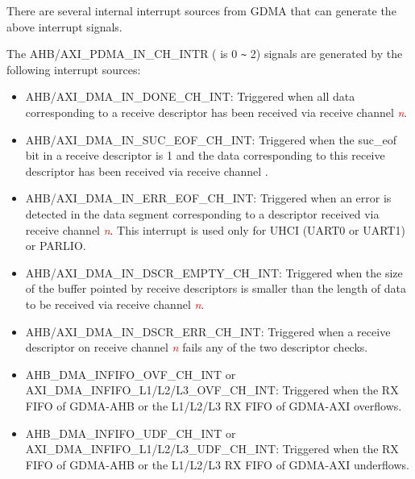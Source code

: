 \documentclass[main\_\_EN.tex]{subfiles}
\begin{document}
There are several internal interrupt sources from GDMA that can generate the above interrupt signals.

The AHB/AXI\_PDMA\_IN\_CH\_INTR ( is 0 \verb+~+ 2) signals are generated by the following interrupt sources:

\begin{itemize}
    \item \label{int:GDMAINDONEINT}AHB/AXI\_DMA\_IN\_DONE\_CH\_INT: Triggered when all data corresponding to a receive descriptor has been received via receive channel \textcolor{red}{\it{n}}.
    \item \label{int:GDMAINSUCEOFINT}AHB/AXI\_DMA\_IN\_SUC\_EOF\_CH\_INT: Triggered when the suc\_eof bit in a receive descriptor is 1 and the data corresponding to this receive descriptor has been received via receive channel .
    \item \label{int:GDMAINERREOFINT}AHB/AXI\_DMA\_IN\_ERR\_EOF\_CH\_INT: Triggered when an error is detected in the data segment corresponding to a descriptor received via receive channel \textcolor{red}{\it{n}}. This interrupt is used only for UHCI (UART0 or UART1) or PARLIO.
    \item \label{int:GDMAINDSCREMPTYINT}AHB/AXI\_DMA\_IN\_DSCR\_EMPTY\_CH\_INT: Triggered when the size of the buffer pointed by receive descriptors is smaller than the length of data to be received via receive channel \textcolor{red}{\it{n}}.
    \item \label{int:GDMAINDSCRERRINT}AHB/AXI\_DMA\_IN\_DSCR\_ERR\_CH\_INT: Triggered when a receive descriptor on receive channel \textcolor{red}{\it{n}} fails any of the two descriptor checks.
    \item \label{int:GDMAINFIFOOVFINT}AHB\_DMA\_INFIFO\_OVF\_CH\_INT or AXI\_DMA\_INFIFO\_L1/L2/L3\_OVF\_CH\_INT: Triggered when the RX FIFO of GDMA-AHB or the L1/L2/L3 RX FIFO of GDMA-AXI overflows.
    \item \label{int:GDMAINFIFOUDFINT}AHB\_DMA\_INFIFO\_UDF\_CH\_INT or AXI\_DMA\_INFIFO\_L1/L2/L3\_UDF\_CH\_INT: Triggered when the RX FIFO of GDMA-AHB or the L1/L2/L3 RX FIFO of GDMA-AXI underflows.
\end{itemize}
\end{document}
